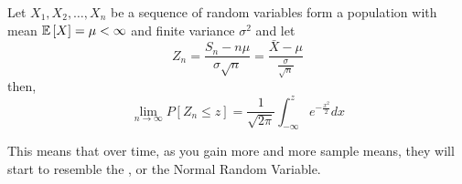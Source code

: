 		\begin{theorem} \label{thm:Central Limit Theorem}
			Let $X_{1},X_{2},\ldots,X_{n}$ be a sequence of  random variables form a population with mean $\operatorname{\mathbb{E}} \left[ X \right] = \mu < \infty$ and finite variance $\sigma^{2}$ and let
			\begin{equation*}
				Z_{n} = \frac{S_{n} - n\mu}{\sigma \sqrt{n}} = \frac{\bar{X} - \mu}{\frac{\sigma}{\sqrt{n}}}
			\end{equation*}
			then,
			\begin{equation} \label{eq:Central Limit Theorem}
				\lim\limits_{n \rightarrow \infty} P \left[ Z_{n} \leq z \right] = \frac{1}{\sqrt{2 \pi}} \int_{-\infty}^{z} e^{-\frac{x^{2}}{2}} dx
			\end{equation}
			\begin{remark*}
				This means that over time, as you gain more and more sample means, they will start to resemble the , or the Normal Random Variable.
			\end{remark*}
		\end{theorem}
	
